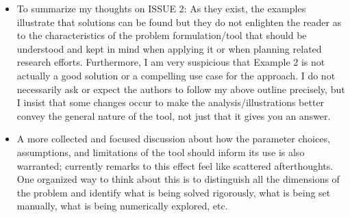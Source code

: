 \documentclass[11pt]{article}
\begin{document}
\begin{itemize}
    \item 
        \begin{itshape}
            To summarize my thoughts on ISSUE 2:
            As they exist, the examples illustrate that solutions can be found but they do not enlighten the reader as to the characteristics of the problem formulation/tool that should be understood and kept in mind when applying it or when planning related research efforts.  Furthermore, I am very suspicious that Example 2 is not actually a good solution or a compelling use case for the approach.  I do not necessarily ask or expect the authors to follow my above outline precisely, but I insist that some changes occur to make the analysis/illustrations better convey the general nature of the tool, not just that it gives you an answer.  
        \end{itshape}

    \item
        \begin{itshape}
            A more collected and focused discussion about how the parameter choices, assumptions, and limitations of the tool should inform its use is also warranted; currently remarks to this effect feel like scattered afterthoughts.  One organized way to think about this is to distinguish all the dimensions of the problem and identify what is being solved rigorously, what is being set manually, what is being numerically explored, etc.
        \end{itshape}
\end{itemize}
% 
% 
\end{document}
